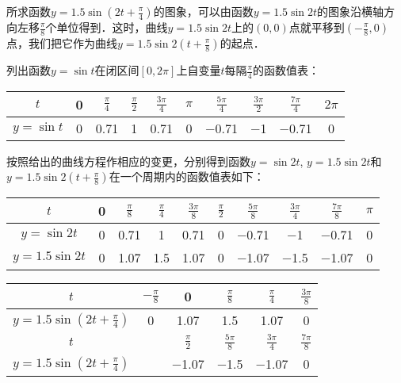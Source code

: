 \begin{solution}
所求函数$y=1.5\sin \left(2t+\frac{\pi}{4}\right)$的图象，可以由函数$y=1.5\sin 2t$的图象沿横轴方向左移$\frac{\pi}{8}$个单位得到．这时，曲线$y=1.5\sin2t$上的$(0, 0)$点就平移到$\left(-\frac{\pi}{8},0\right)$
点，我们把它作为曲线$y=1.5\sin2 \left(t+\frac{\pi}{8}\right)$的起点．

列出函数$y=\sin t$在闭区间$[0, 2\pi]$上自变量$t$每隔$\frac{\pi}{4}$的函数值表：
\begin{center}
\begin{tabular}{c|ccccccccc}
    \hline
$t$  &  0  &  $\frac{\pi}{4}$ & $\frac{\pi}{2}$   & $\frac{3\pi}{4}$  & $\pi$   & $\frac{5\pi}{4}$  & $\frac{3\pi}{2}$   & $\frac{7\pi}{4}$ &$2\pi$ \\ 
    \hline
$y=\sin t$  & 0   &   0.71 &  1 & 0.71   & 0  & $-$0.71   &  $-$1 & $-$0.71   & 0\\
    \hline
\end{tabular}
\end{center}

按照给出的曲线方程作相应的变更，分别得到函数$y=\sin2t$, $y=1.5\sin2t$和$y=1.5\sin2\left(t+\frac{\pi}{8}\right)$在一个周期内的函数值表如下：
\begin{center}
\begin{tabular}{c|ccccccccc}
    \hline
$t$  &  0  &  $\frac{\pi}{8}$ & $\frac{\pi}{4}$   & $\frac{3\pi}{8}$  & $\frac{\pi}{2}$   & $\frac{5\pi}{8}$  & $\frac{3\pi}{4}$   & $\frac{7\pi}{8}$ &$\pi$ \\ 
    \hline
$y=\sin 2t$  & 0   &   0.71 &  1 & 0.71   & 0  & $-$0.71   &  $-$1 & $-$0.71   & 0\\
$y=1.5\sin 2t$ & 0   &   1.07 &  1.5 & 1.07   & 0  & $-$1.07   &  $-$1.5 & $-$1.07   & 0\\
    \hline
\end{tabular}
\end{center}

\begin{center}
\begin{tabular}{c|ccccc}
    \hline
$t$  &  $-\frac{\pi}{8}$ & 0 & $\frac{\pi}{8}$   & $\frac{\pi}{4}$  & $\frac{3\pi}{8}$   \\     \hline
$y=1.5\sin \left(2t+\frac{\pi}{4}\right)$  & 0   &   1.07 &  1.5 & 1.07   & 0 \\
    \hline
    $t$  && $\frac{\pi}{2}$  & $\frac{5\pi}{8}$   & $\frac{3\pi}{4}$ &$\frac{7\pi}{8}$ \\
    \hline
    $y=1.5\sin \left(2t+\frac{\pi}{4}\right)$  &  & $-$1.07   &  $-$1.5 & $-$1.07   & 0\\
    \hline
\end{tabular}
\end{center}


\end{solution}
